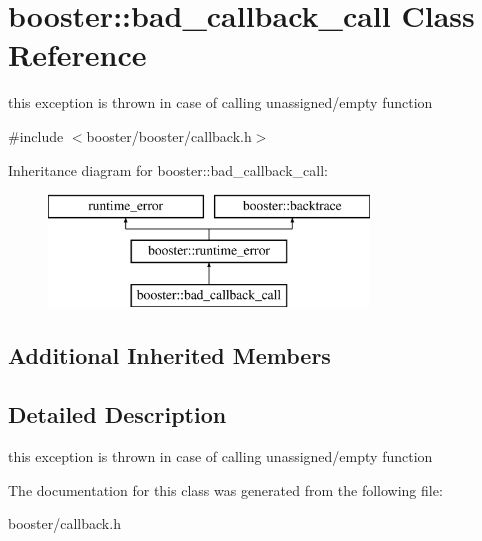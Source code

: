 \section{booster\+:\+:bad\+\_\+callback\+\_\+call Class Reference}
\label{classbooster_1_1bad__callback__call}


this exception is thrown in case of calling unassigned/empty function  




{\ttfamily \#include $<$booster/booster/callback.\+h$>$}

Inheritance diagram for booster\+:\+:bad\+\_\+callback\+\_\+call\+:\begin{figure}[H]
\begin{center}
\leavevmode
\includegraphics[height=3.000000cm]{classbooster_1_1bad__callback__call}
\end{center}
\end{figure}
\subsection*{Additional Inherited Members}


\subsection{Detailed Description}
this exception is thrown in case of calling unassigned/empty function 

The documentation for this class was generated from the following file\+:\begin{DoxyCompactItemize}
\item 
booster/callback.\+h\end{DoxyCompactItemize}
